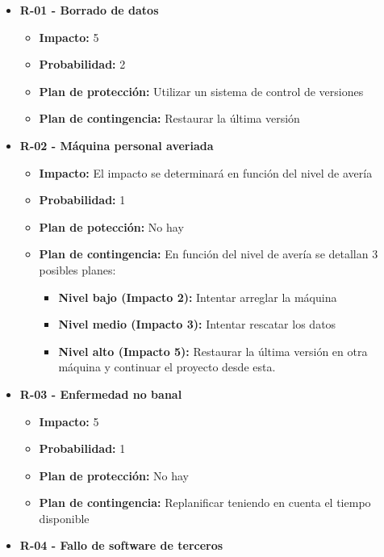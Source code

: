 \documentclass[openright,twoside,10pt]{book}
\providecommand{\tightlist}{%
  \setlength{\itemsep}{0pt}\setlength{\parskip}{0pt}}
\begin{document}
    \begin{itemize}
    \tightlist
    \item
      \textbf{R-01 - Borrado de datos}
    
      \begin{itemize}
      \tightlist
      \item
        \textbf{Impacto:} 5
      \item
        \textbf{Probabilidad:} 2
      \item
        \textbf{Plan de protección:} Utilizar un sistema de control de
        versiones
      \item
        \textbf{Plan de contingencia:} Restaurar la última versión
      \end{itemize}
    \item
      \textbf{R-02 - Máquina personal averiada}
    
      \begin{itemize}
      \tightlist
      \item
        \textbf{Impacto:} El impacto se determinará en función del nivel de
        avería
      \item
        \textbf{Probabilidad:} 1
      \item
        \textbf{Plan de potección:} No hay
      \item
        \textbf{Plan de contingencia:} En función del nivel de avería se
        detallan 3 posibles planes:
    
        \begin{itemize}
        \tightlist
        \item
          \textbf{Nivel bajo (Impacto 2):} Intentar arreglar la máquina
        \item
          \textbf{Nivel medio (Impacto 3):} Intentar rescatar los datos
        \item
          \textbf{Nivel alto (Impacto 5):} Restaurar la última versión en
          otra máquina y continuar el proyecto desde esta.
        \end{itemize}
      \end{itemize}
    \item
      \textbf{R-03 - Enfermedad no banal}
    
      \begin{itemize}
      \tightlist
      \item
        \textbf{Impacto:} 5
      \item
        \textbf{Probabilidad:} 1
      \item
        \textbf{Plan de protección:} No hay
      \item
        \textbf{Plan de contingencia:} Replanificar teniendo en cuenta el
        tiempo disponible
      \end{itemize}
    \item
      \textbf{R-04 - Fallo de software de terceros}
    

\end{itemize}
\end{document}
